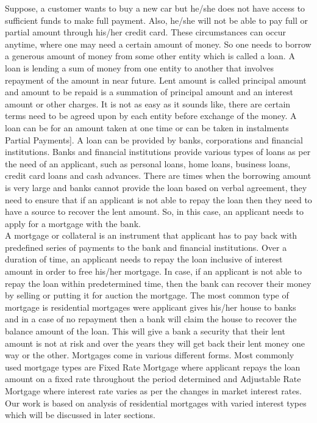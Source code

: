Suppose, a customer wants to buy a new car but he/she does not have access to sufficient funds to make full payment. Also, he/she will not be able to pay full or partial amount through his/her credit card. These circumstances can occur anytime, where one may need a certain amount of money. So one needs to borrow a generous amount of money from some other entity which is called a loan. A loan is lending a sum of money from one entity to another that involves repayment of the amount in near future. Lent amount is called principal amount and amount to be repaid is a summation of principal amount and an interest amount or other charges. It is not as easy as it sounds like, there are certain terms need to be agreed upon by each entity before exchange of the money. A loan can be for an amount taken at one time or can be taken in instalments {Partial Payments]. A loan can be provided by banks, corporations and financial institutions. Banks and financial institutions provide various types of loans as per the need of an applicant, such as personal loans, home loans, business loans, credit card loans and cash advances. There are times when the borrowing amount is very large and banks cannot provide the loan based on verbal agreement, they need to ensure that if an applicant is not able to repay the loan then they need to have a source to recover the lent amount. So, in this case, an applicant needs to apply for a mortgage with the bank.\\

A mortgage or collateral is an instrument that applicant has to pay back with predefined series of payments to the bank and financial institutions. Over a duration of time, an applicant needs to repay the loan inclusive of interest amount in order to free his/her mortgage. In case, if an applicant is not able to repay the loan within predetermined time, then the bank can recover their money by selling or putting it for auction the mortgage. The most common type of mortgage is residential mortgages were applicant gives his/her house to banks and in a case of no repayment then a bank will claim the house to recover the balance amount of the loan. This will give a bank a security that their lent amount is not at risk and over the years they will get back their lent money one way or the other. Mortgages come in various different forms. Most commonly used mortgage types are Fixed Rate Mortgage where applicant repays the loan amount on a fixed rate throughout the period determined and Adjustable Rate Mortgage where interest rate varies as per the changes in market interest rates. Our work is based on analysis of residential mortgages with varied interest types which will be discussed in later sections.\\

}
